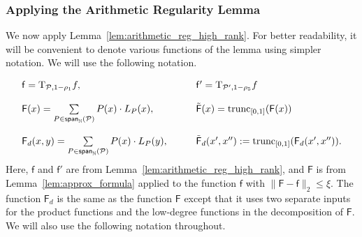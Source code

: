 \documentclass[11pt]{article}
\newcommand\norm[1]{\| #1 \|}
\newcommand\Expect[2]{{\mathop{\mathbb{E}}_{#1}\left[ {#2} \right]}}
\newcommand\spn{{\sf span}_{\mathbb{N}}}
\renewcommand\leq{\leqslant}
\newcommand{\V}[1]{{#1}}
\begin{document}
\subsubsection{Applying the Arithmetic Regularity Lemma}
\label{sec:apply_arl}
We now apply Lemma~\ref{lem:arithmetic_reg_high_rank}. For better readability, it will be convenient to denote various functions of the lemma using simpler notation. We will use the following notation.


\newcommand{\noisyfcoarse}{\mathsf{f}}
\newcommand{\noisyfrefined}{\mathsf{f}'}
\newcommand{\fcoarsedecomposed}{{\mathsf{F}}}
\newcommand{\fcoarsedecoupled}{{\mathsf{F}_d}{}}
\newcommand{\truncfcoarsedecomposed}{\tilde{\mathsf{F}}}
\newcommand{\truncfcoarsedecoupled}{{\tilde{\mathsf{F}}_d}{}}
\newcommand{\truncmultilinfcoarsedecoupled}{{\widetilde{\mathsf{M}}_d}{}}
\newcommand{\multilinfcoarsedecoupled}{{{\mathsf{M}}_d}{}}


\begin{equation}
\label{eq:regularity_functions}
\begin{array}{ll}
   \noisyfcoarse = \mathrm{T}_{\mathcal{P},1-\rho_1}f,  &\quad\quad \noisyfrefined = \mathrm{T}_{\mathcal{P}',1-\rho_5}f\\ \\
   \fcoarsedecomposed(\V x)  = \sum\limits_{P\in \spn(\mathcal{P})}P(x)\cdot L_{P}(\V x), &\quad\quad\truncfcoarsedecomposed(\V x) = \mathrm{trunc}_{[0,1]}(\fcoarsedecomposed(\V x))\\ \\
   \fcoarsedecoupled(\V x, \V y)  = \sum\limits_{P\in \spn(\mathcal{P})}P(\V x)\cdot L_{P}(\V y), &\quad\quad\truncfcoarsedecoupled(\V x', \V x'') := \mathrm{trunc}_{[0,1]}(\fcoarsedecoupled(\V x', \V x'')).
\end{array}
\end{equation}
%
Here, $\noisyfcoarse$ 
and $\noisyfrefined$ are from Lemma~\ref{lem:arithmetic_reg_high_rank}, and $\fcoarsedecomposed$ is from Lemma~\ref{lem:approx_formula} applied to the function $\noisyfcoarse$ 
with
$\norm{\fcoarsedecomposed - \noisyfcoarse}_2 \leq \xi$. The function $\fcoarsedecoupled$ is the same as the function $\fcoarsedecomposed$ except that it uses two separate inputs for the product functions and the low-degree functions in the decomposition of $\fcoarsedecomposed$. We will also use the following notation throughout.\\
\end{document}

